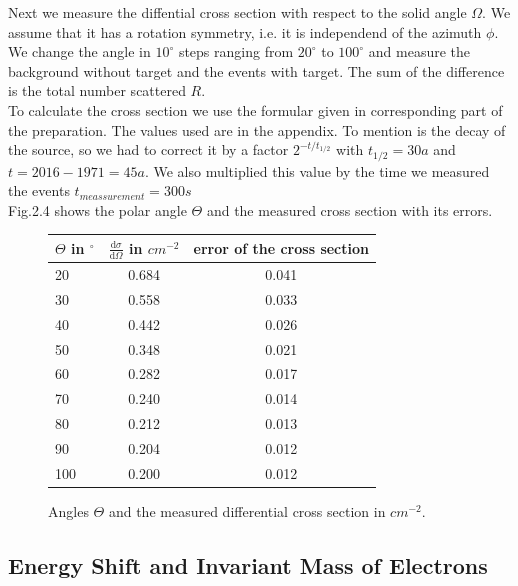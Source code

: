 Next we measure the diffential cross section with respect to the solid angle $\Omega$. We assume that it has a rotation symmetry, i.e. it is independend of the azimuth $\phi$.\\
We change the angle in $10 ^{\circ}$ steps ranging from $20 ^{\circ}$ to $100 ^{\circ}$ and measure the background without target and the events with target. The sum of the difference is the total number scattered $R$. \\
To calculate the cross section we use the formular given in corresponding part of the preparation. The values used are in the appendix. To mention is the decay of the source, so we had to correct it by a factor $2^{-t/t_{1/2}}$ with $t_{1/2} = 30a$ and $t = 2016 - 1971 = 45a$. We also multiplied this value by the time we measured the events $t_{meassurement} = 300s$\\
Fig.2.4 shows the polar angle $\Theta$ and the measured cross section with its errors.

\vspace{5cm}

\begin{figure}[h]
\centering
\caption{Angles $\Theta$ and the measured differential cross section in $cm^{-2}$.}
\vspace{0.2cm}
\begin{tabular}{lcc}
$\Theta$ in ${}^{\circ}$ & $\frac{\mathrm{d}\sigma}{\mathrm{d}\Omega}$ in $cm^{-2}$ & error of the cross section  \\
\hline
\hline
20     &  0.684 & 0.041 \\
30     &  0.558 & 0.033 \\
40     &  0.442 & 0.026 \\
50     &  0.348 & 0.021 \\
60     &  0.282 & 0.017 \\
70     &  0.240 & 0.014 \\
80     &  0.212 & 0.013 \\
90     &  0.204 & 0.012 \\
100    &  0.200 & 0.012 \\
\end{tabular}
\end{figure}

\newpage

\subsection{Energy Shift and Invariant Mass of Electrons}


